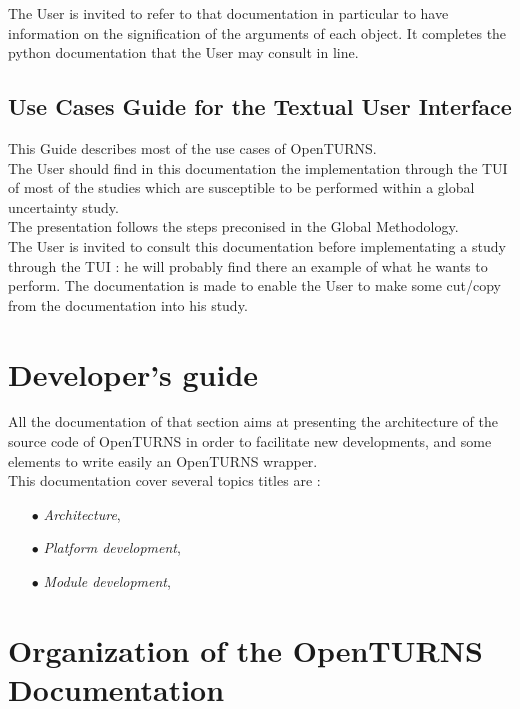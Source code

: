 \documentclass[11pt]{article}
\begin{document}
The User is invited to refer to that documentation in particular to have information on the signification of the arguments of each object. It completes the python documentation that the User may consult in line.

\subsection{Use Cases Guide for the Textual User Interface}

This Guide describes most of the use cases of OpenTURNS.\\

The User should find in this documentation the implementation through the TUI of most of the studies which are susceptible to be performed within a global uncertainty study.\\

The presentation follows the steps preconised in the Global Methodology.\\

The User is invited to consult this documentation before implementating a study through the TUI : he will probably find there an example of what he wants to perform. The documentation is made to enable the User to make some cut/copy from the documentation into his study.

\section{Developer's guide}

All the documentation of that section aims at presenting the architecture of the source code of OpenTURNS in order to facilitate new developments, and some elements to write easily an OpenTURNS wrapper.\\

This documentation cover several topics titles are :
\begin{itemize}
\item[$\bullet$] {\itshape Architecture},
\item[$\bullet$] {\itshape Platform development},
\item[$\bullet$] {\itshape Module development},
\end{itemize}

\section{Organization of the OpenTURNS Documentation}
\end{document}
